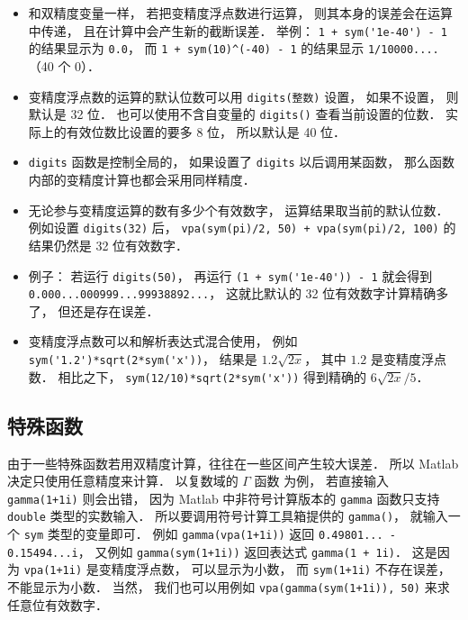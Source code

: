 \begin{itemize}
\item 和双精度变量一样， 若把变精度浮点数进行运算， 则其本身的误差会在运算中传递， 且在计算中会产生新的截断误差． 举例： \verb|1 + sym('1e-40') - 1| 的结果显示为 \verb|0.0|， 而 \verb|1 + sym(10)^(-40) - 1| 的结果显示 \verb|1/10000....|（40 个 0）．

\item 变精度浮点数的运算的默认位数可以用 \verb|digits(整数)| 设置， 如果不设置， 则默认是 32 位． 也可以使用不含自变量的 \verb|digits()| 查看当前设置的位数． 实际上的有效位数比设置的要多 8 位， 所以默认是 40 位．

\item \verb|digits| 函数是控制全局的， 如果设置了 \verb|digits| 以后调用某函数， 那么函数内部的变精度计算也都会采用同样精度．

\item 无论参与变精度运算的数有多少个有效数字， 运算结果取当前的默认位数． 例如设置 \verb|digits(32)| 后， \verb|vpa(sym(pi)/2, 50) + vpa(sym(pi)/2, 100)| 的结果仍然是 32 位有效数字．

\item 例子： 若运行 \verb|digits(50)|， 再运行 \verb|(1 + sym('1e-40')) - 1| 就会得到 \verb|0.000...000999...99938892...|， 这就比默认的 32 位有效数字计算精确多了， 但还是存在误差．

\item 变精度浮点数可以和解析表达式混合使用， 例如 \verb|sym('1.2')*sqrt(2*sym('x'))|， 结果是 $1.2 \sqrt{2x}$， 其中 $1.2$ 是变精度浮点数． 相比之下， \verb|sym(12/10)*sqrt(2*sym('x'))| 得到精确的 $6\sqrt{2x}/5$．
\end{itemize}

\subsection{特殊函数}
由于一些特殊函数若用双精度计算，往往在一些区间产生较大误差． 所以 Matlab 决定只使用任意精度来计算． 以复数域的 $\Gamma$ 函数 为例， 若直接输入 \verb|gamma(1+1i)| 则会出错， 因为 Matlab 中非符号计算版本的 \verb|gamma| 函数只支持 \verb|double| 类型的实数输入． 所以要调用符号计算工具箱提供的 \verb|gamma()|， 就输入一个 \verb|sym| 类型的变量即可． 例如 \verb|gamma(vpa(1+1i))| 返回 \verb|0.49801... - 0.15494...i|， 又例如 \verb|gamma(sym(1+1i))| 返回表达式 \verb|gamma(1 + 1i)|． 这是因为 \verb|vpa(1+1i)| 是变精度浮点数， 可以显示为小数， 而 \verb|sym(1+1i)| 不存在误差， 不能显示为小数． 当然， 我们也可以用例如 \verb|vpa(gamma(sym(1+1i)), 50)| 来求任意位有效数字．
